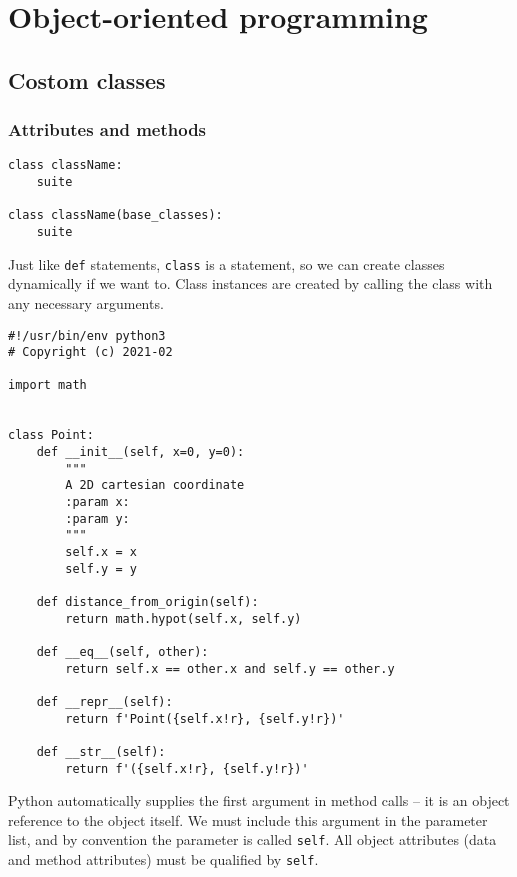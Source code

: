 
\chapter{Object-oriented programming}

\section{Costom classes}

\subsection{Attributes and methods}


\begin{tcolorbox}
\begin{verbatim}
class className:
    suite

class className(base_classes):
    suite
\end{verbatim}
\end{tcolorbox}

Just like \verb|def| statements, \verb|class| is a statement, so we can create classes dynamically if we want to.
Class instances are created by calling the class with any necessary arguments.


\begin{lstlisting}
#!/usr/bin/env python3
# Copyright (c) 2021-02

import math


class Point:
    def __init__(self, x=0, y=0):
        """
        A 2D cartesian coordinate
        :param x:
        :param y:
        """
        self.x = x
        self.y = y

    def distance_from_origin(self):
        return math.hypot(self.x, self.y)

    def __eq__(self, other):
        return self.x == other.x and self.y == other.y

    def __repr__(self):
        return f'Point({self.x!r}, {self.y!r})'

    def __str__(self):
        return f'({self.x!r}, {self.y!r})'

\end{lstlisting}


Python automatically supplies the first argument in method calls -- it is an object reference to the object itself.
We must include this argument in the parameter list, and by convention the parameter is called \verb|self|.
All object attributes (data and method attributes) must be qualified by \verb|self|.



